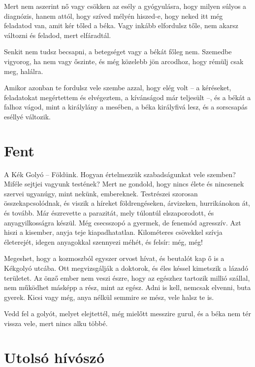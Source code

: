 \bigskip
\begin{itshape}
Mert nem aszerint nő vagy csökken az esély a gyógyulásra, hogy milyen
súlyos a diagnózis, hanem attól, hogy szíved mélyén hiszed-e, hogy neked itt
még feladatod van, amit kér tőled a béka. Vagy inkább elfordulsz tőle, nem
akarsz változni és feladod, mert elfáradtál.

Senkit nem tudsz becsapni, a betegséget vagy a békát főleg nem. Szemedbe
vigyorog, ha nem vagy őszinte, és még közelebb jön arcodhoz, hogy
rémülj csak meg, halálra.

Amikor azonban te fordulsz vele szembe azzal, hogy elég volt -- a kéréseket,
feladatokat megértettem és elvégeztem, a kívánságod már teljesült --, és
a békát a falhoz vágod, mint a királylány a mesében, a béka királyfivá lesz,
és a sorscsapás eséllyé változik.
\end{itshape}

\section{Fent}

A Kék Golyó -- Földünk. Hogyan értelmezzük szabadságunkat vele
szemben? Miféle sejtjei vagyunk testének? Mert ne gondold, hogy
nincs élete és nincsenek szervei ugyanúgy, mint nekünk, embereknek.
Testrészei szorosan összekapcsolódnak, és viszik a híreket földrengéseken,
árvizeken, hurrikánokon át, és tovább. Már észrevette a parazitát,
mely túlontúl elszaporodott, és anyagyilkosságra készül. Még
csecsszopó a gyermek, de fenemód agresszív. Azt hiszi a kisember,
anyja teje kiapadhatatlan. Kilométeres csövekkel szívja életerejét,
idegen anyagokkal szennyezi méhét, és felsír: még, még!

Megeshet, hogy a kozmoszból egyszer orvost hívat, és beutalót kap
ő is a Kékgolyó utcába. Ott megvizsgálják a doktorok, és éles késsel
kimetszik a lázadó területet. Az önző ember nem veszi észre, hogy az
egészhez tartozik millió szállal, nem működhet másképp a rész, mint
az egész. Adni is kell, nemcsak elvenni, buta gyerek. Kicsi vagy még,
anya nélkül semmire se mész, vele halsz te is.

\bigskip
\begin{itshape}
Vedd fel a golyót, melyet elejtettél, még mielőtt messzire gurul, és a béka
nem tér vissza vele, mert nincs alku többé.
\end{itshape}

\section{Utolsó hívószó}

